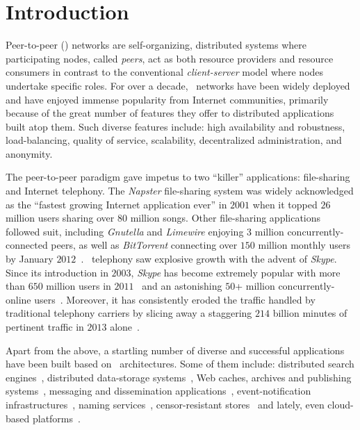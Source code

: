 \section{Introduction}
\label{section:intro}

Peer-to-peer (\p) networks are self-organizing, distributed systems where
participating nodes, called \emph{peers}, act as both resource providers and
resource consumers in contrast to the conventional \emph{client-server} model
where nodes undertake specific roles.
For over a decade, \p\ networks have been widely deployed and have
enjoyed immense popularity from Internet communities, primarily because
of the great number of features they offer to distributed applications 
built atop them. 
Such diverse features include:  high availability and robustness,
load-balancing, quality of service, scalability, decentralized administration,
and anonymity. 

The peer-to-peer paradigm gave impetus to two ``killer'' applications:
file-sharing and Internet telephony.
The {\sl Napster} file-sharing system was widely acknowledged as the 
``fastest growing Internet application ever'' in $2001$ when it topped
$26$ million users sharing over $80$ million songs.
Other file-sharing applications followed suit, 
including {\sl Gnutella} and {\sl Limewire} enjoying $3$ 
million concurrently-connected peers, as well as 
{\sl BitTorrent} connecting over $150$ million monthly users by January $2012$~\cite{bittorrentusers}.
\p\ telephony saw explosive growth with the advent of {\sl Skype}.
Since its introduction in $2003$,
{\sl Skype} has become extremely popular with more than $650$ million users 
in $2011$~\cite{skypetotalusers} and an astonishing 
$50$+ million concurrently-online users~\cite{skypesymusers}.
Moreover, it has consistently eroded  the traffic handled by 
traditional telephony carriers by slicing away a staggering 
$214$ billion minutes of pertinent traffic in $2013$ alone~\cite{skypetraffic}.

Apart from the above, a startling number of diverse and successful
applications have been built based on \p\ architectures. Some of them include:
distributed search engines~\cite{yaci}, 
distributed data-storage systems~\cite{kbc_oceanstore_2000,bdet_fsdfs_2000,dkkms_cfs_2001,dr_pastutility_2001,abc_farsite_2002,mmfc_ivy_2002,arla,agebh_dks_2003},
Web caches, archives and publishing systems~\cite{ird_squirrel_2002,bags_youserv_2002,wrc_publius_2000,wm_tangler_2001},
messaging and dissemination applications~\cite{threedegrees,icpp08-pd}, 
event-notification infrastructures~\cite{rkcd_scribe_2001,cdkr_scribe_2002,agebh_dks_2003}, 
naming services~\cite{cmm_chorddns_2002}, 
censor-resistant stores~\cite{cswh_freenet_2001} and
lately, even cloud-based platforms~\cite{mgpj_cloudsnap_2011}.

